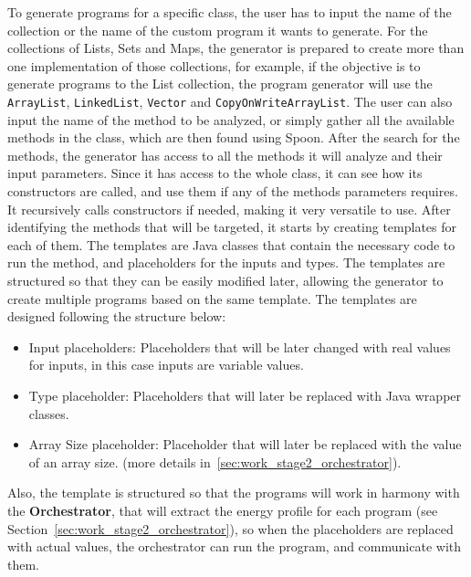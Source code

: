 To generate programs for a specific class, the user has to input the name of the collection or the name of the custom program it wants to generate. For the collections of Lists, Sets and Maps, the generator is prepared to create more than one implementation of those collections, for example, if the objective is to generate programs to the List collection, the program generator will use the \texttt{ArrayList}, \texttt{LinkedList}, \texttt{Vector} and \texttt{CopyOnWriteArrayList}. The user can also input the name of the method to be analyzed, or simply gather all the available methods in the class, which are then found using Spoon.
After the search for the methods, the generator has access to all the methods it will analyze and their input parameters. Since it has access to the whole class, it can see how its constructors are called, and use them if any of the methods parameters requires. It recursively calls constructors if needed, making it very versatile to use. After identifying the methods that will be targeted, it starts by creating templates for each of them. The templates are Java classes that contain the necessary code to run the method, and placeholders for the inputs and types. The templates are structured so that they can be easily modified later, allowing the generator to create multiple programs based on the same template. The templates are designed following the structure below:

\begin{itemize}

\item Input placeholders: Placeholders that will be later changed with real values for inputs, in this case inputs are variable values. 

\item Type placeholder: Placeholders that will later be replaced with Java wrapper classes.
  
\item Array Size placeholder: Placeholder that will later be replaced with the value of an array size. (more details in~\ref{sec:work_stage2_orchestrator}). 

\end{itemize}

Also, the template is structured so that the programs will work in harmony with the \textbf{Orchestrator}, that will extract the energy profile for each program (see Section~\ref{sec:work_stage2_orchestrator}), so when the placeholders are replaced with actual values, the orchestrator can run the program, and communicate with them.


